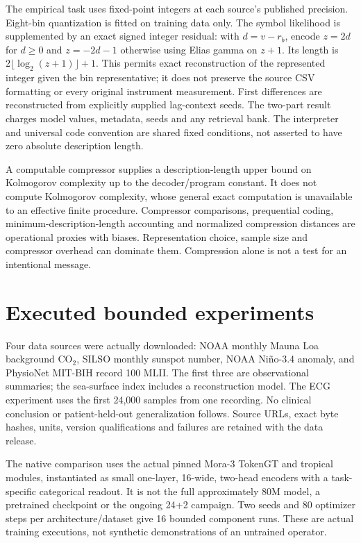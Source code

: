 The empirical task uses fixed-point integers at each source's published precision. Eight-bin quantization is fitted on training data only. The symbol likelihood is supplemented by an exact signed integer residual: with $d=v-r_b$, encode $z=2d$ for $d\ge0$ and $z=-2d-1$ otherwise using Elias gamma on $z+1$. Its length is $2\lfloor\log_2(z+1)\rfloor+1$. This permits exact reconstruction of the represented integer given the bin representative; it does not preserve the source CSV formatting or every original instrument measurement. First differences are reconstructed from explicitly supplied lag-context seeds. The two-part result charges model values, metadata, seeds and any retrieval bank. The interpreter and universal code convention are shared fixed conditions, not asserted to have zero absolute description length.

A computable compressor supplies a description-length upper bound on Kolmogorov complexity up to the decoder/program constant. It does not compute Kolmogorov complexity, whose general exact computation is unavailable to an effective finite procedure. Compressor comparisons, prequential coding, minimum-description-length accounting and normalized compression distances are operational proxies with biases. Representation choice, sample size and compressor overhead can dominate them. Compression alone is not a test for an intentional message.

\section{Executed bounded experiments}

Four data sources were actually downloaded: NOAA monthly Mauna Loa background CO$_2$, SILSO monthly sunspot number, NOAA Ni\~no-3.4 anomaly, and PhysioNet MIT-BIH record 100 MLII. The first three are observational summaries; the sea-surface index includes a reconstruction model. The ECG experiment uses the first 24,000 samples from one recording. No clinical conclusion or patient-held-out generalization follows. Source URLs, exact byte hashes, units, version qualifications and failures are retained with the data release.

The native comparison uses the actual pinned Mora-3 TokenGT and tropical modules, instantiated as small one-layer, 16-wide, two-head encoders with a task-specific categorical readout. It is not the full approximately 80M model, a pretrained checkpoint or the ongoing 24+2 campaign. Two seeds and 80 optimizer steps per architecture/dataset give 16 bounded component runs. These are actual training executions, not synthetic demonstrations of an untrained operator.

